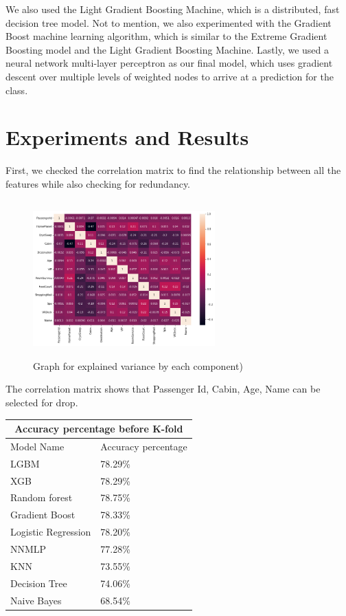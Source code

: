 \documentclass[fleqn,10pt]{SelfArx} %
\begin{document}
We also used the Light Gradient Boosting Machine, which is a distributed, fast decision tree model. Not to mention, we also experimented with the Gradient Boost machine learning algorithm, which is similar to the Extreme Gradient Boosting model and the Light Gradient Boosting Machine. Lastly, we used a neural network multi-layer perceptron as our final model, which uses gradient descent over multiple levels of weighted nodes to arrive at a prediction for the class. 

\bigskip
\bigskip
\section{Experiments and Results}
First, we checked the correlation matrix to find the relationship between all the features while also checking for redundancy. 
\begin{figure}[H]
    \centering
    \includegraphics[width=7cm, height=6cm]{img/ssss.png}
    \caption{Graph for explained variance by each component)}
    \label{fig:my_label}
\end{figure}
 The correlation matrix shows that Passenger Id, Cabin, Age, Name can be selected for drop.

\bigskip

\begin{tabular}{ |p{3cm}|p{3cm}|  }
\hline
\multicolumn{2}{|c|}{Accuracy percentage before K-fold} \\
\hline
Model Name& Accuracy percentage \\
\hline
LGBM & 78.29\% \\
XGB & 78.29\%\\
Random forest & 78.75\% \\
Gradient Boost    & 78.33\% \\
Logistic Regression & 78.20\%\\
NNMLP & 77.28\% \\
KNN & 73.55\%  \\
Decision Tree & 74.06\% \\
Naive Bayes	 & 68.54\%  \\
\hline
\end{tabular}
\end{document}
